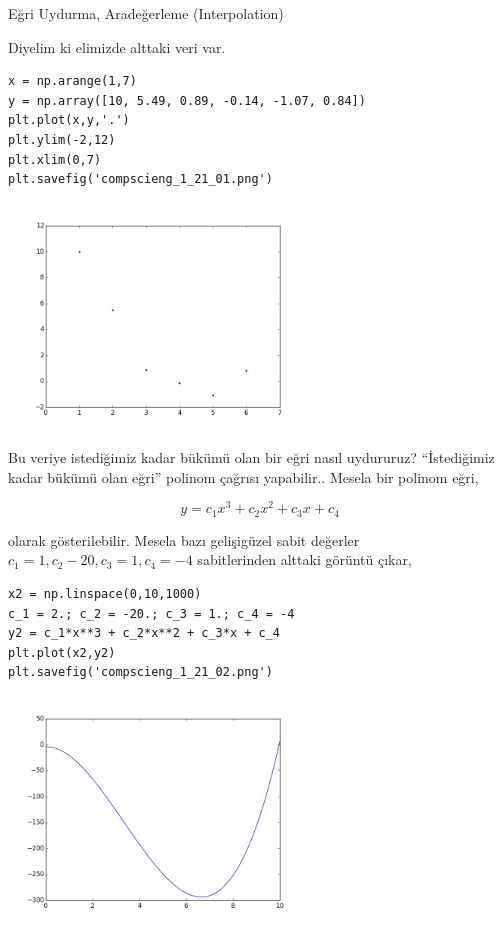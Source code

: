 \documentclass[12pt,fleqn]{article}\usepackage{../../common}
\begin{document}
Eğri Uydurma, Aradeğerleme (Interpolation)

Diyelim ki elimizde alttaki veri var.

\begin{verbatim}
x = np.arange(1,7)
y = np.array([10, 5.49, 0.89, -0.14, -1.07, 0.84])
plt.plot(x,y,'.')
plt.ylim(-2,12)
plt.xlim(0,7)
plt.savefig('compscieng_1_21_01.png')
\end{verbatim}

\includegraphics[height=6cm]{compscieng_1_21_01.png}

Bu veriye istediğimiz kadar bükümü olan bir eğri nasıl uydururuz?
``İstediğimiz kadar bükümü olan eğri'' polinom çağrısı yapabilir.. Mesela
bir polinom eğri,

$$ y = c_1 x^3 + c_2x^2 + c_3x + c_4 $$

olarak gösterilebilir. Mesela bazı gelişigüzel sabit değerler
$c_1=1,c_2-20,c_3=1,c_4=-4$ sabitlerinden alttaki görüntü çıkar,

\begin{verbatim}
x2 = np.linspace(0,10,1000)
c_1 = 2.; c_2 = -20.; c_3 = 1.; c_4 = -4
y2 = c_1*x**3 + c_2*x**2 + c_3*x + c_4
plt.plot(x2,y2)
plt.savefig('compscieng_1_21_02.png')
\end{verbatim}

\includegraphics[height=6cm]{compscieng_1_21_02.png}
\end{document}
